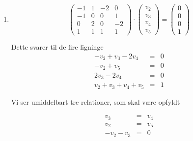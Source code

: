 \begin{enumerate}
  \item
    \begin{equation}
      \left( 
      \begin{array}{cccc}
        -1 & 1 & -2 & 0 \\
        -1 & 0 & 0  & 1 \\
         0 & 2 & 0  & -2 \\
         1 & 1 & 1  & 1 
       \end{array}
       \right) \cdot
       \left(
       \begin{array}{c}
         v_2 \\
         v_3 \\
         v_4 \\
         v_5
       \end{array}
       \right) = 
       \left(
       \begin{array}{c}
         0 \\
         0 \\
         0 \\
         1
       \end{array}
       \right) 
     \end{equation}
     
     Dette svarer til de fire ligninge
     \begin{eqnarray*}
       -v_2 + v_3 -2 v_4 &=& 0 \\
       -v_2 + v_5        &=& 0 \\
       2v_3 - 2v_4       &=& 0 \\
       v_2 +v_3 +v_4 +v_5 &=& 1 
     \end{eqnarray*}
     
     Vi ser umiddelbart tre relationer, som skal v{\ae}re opfyldt

     \begin{eqnarray*}
       v_3 &=& v_4 \\
       v_2 &=& v_5 \\
       -v_2-v_3 &=& 0
     \end{eqnarray*}


\end{enumerate}

